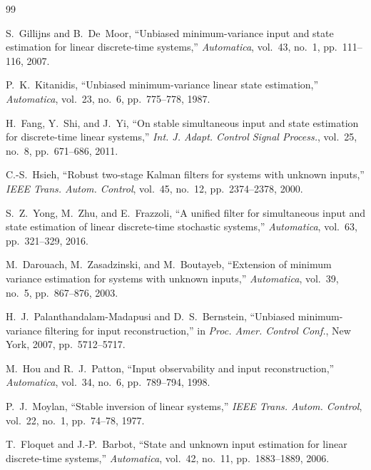 \documentclass[lettersize,journal]{IEEEtran}
\begin{document}
\begin{thebibliography}{99}

S.~Gillijns and B.~De~Moor, ``Unbiased minimum-variance input and state estimation for linear discrete-time systems,'' \textit{Automatica}, vol.~43, no.~1, pp.~111--116, 2007.

P.~K.~Kitanidis, ``Unbiased minimum-variance linear state estimation,'' \textit{Automatica}, vol.~23, no.~6, pp.~775--778, 1987.

H.~Fang, Y.~Shi, and J.~Yi, ``On stable simultaneous input and state estimation for discrete-time linear systems,'' \textit{Int. J. Adapt. Control Signal Process.}, vol.~25, no.~8, pp.~671--686, 2011.

C.-S.~Hsieh, ``Robust two-stage Kalman filters for systems with unknown inputs,'' \textit{IEEE Trans. Autom. Control}, vol.~45, no.~12, pp.~2374--2378, 2000.

S.~Z.~Yong, M.~Zhu, and E.~Frazzoli, ``A unified filter for simultaneous input and state estimation of linear discrete-time stochastic systems,'' \textit{Automatica}, vol.~63, pp.~321--329, 2016.

M.~Darouach, M.~Zasadzinski, and M.~Boutayeb, ``Extension of minimum variance estimation for systems with unknown inputs,'' \textit{Automatica}, vol.~39, no.~5, pp.~867--876, 2003.

H.~J.~Palanthandalam-Madapusi and D.~S.~Bernstein, ``Unbiased minimum-variance filtering for input reconstruction,'' in \textit{Proc. Amer. Control Conf.}, New York, 2007, pp.~5712--5717.

M.~Hou and R.~J.~Patton, ``Input observability and input reconstruction,'' \textit{Automatica}, vol.~34, no.~6, pp.~789--794, 1998.

P.~J.~Moylan, ``Stable inversion of linear systems,'' \textit{IEEE Trans. Autom. Control}, vol.~22, no.~1, pp.~74--78, 1977.

T.~Floquet and J.-P.~Barbot, ``State and unknown input estimation for linear discrete-time systems,'' \textit{Automatica}, vol.~42, no.~11, pp.~1883--1889, 2006.


\end{thebibliography}
\end{document}
